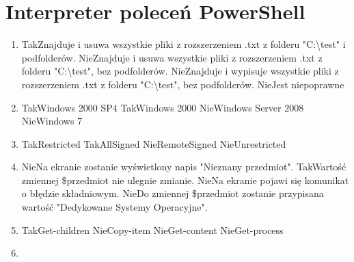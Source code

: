 

\newpage
\section{Interpreter poleceń PowerShell}
	\begin{enumerate}
		\item {}%
		{Tak}{Znajduje i usuwa wszystkie pliki z rozszerzeniem .txt z folderu "C:\textbackslash test" i podfolderów.}%
		{Nie}{Znajduje i usuwa wszystkie pliki z rozszerzeniem .txt z folderu "C:\textbackslash test", bez podfolderów.}%
		{Nie}{Znajduje i wypisuje wszystkie pliki z rozszerzeniem .txt z folderu "C:\textbackslash test", bez podfolderów.}%
		{Nie}{Jest niepoprawne}
		\item {}%
		{Tak}{Windows 2000 SP4}%
		{Tak}{Windows 2000}%
		{Nie}{Windows Server 2008}%
		{Nie}{Windows 7}
		\item {}%
		{Tak}{Restricted}%
		{Tak}{AllSigned}%
		{Nie}{RemoteSigned}%
		{Nie}{Unrestricted}
		\item {}%
		{Nie}{Na ekranie zostanie wyświetlony napis "Nieznany przedmiot".}%
		{Tak}{Wartość zmiennej \$przedmiot nie ulegnie zmianie.}%
		{Nie}{Na ekranie pojawi się komunikat o błędzie składniowym.}%
		{Nie}{Do zmiennej \$przedmiot zostanie przypisana wartość "Dedykowane Systemy Operacyjne".}
		\newpage
		\item {}%
		{Tak}{Get-children}%
		{Nie}{Copy-item}%
		{Nie}{Get-content}%
		{Nie}{Get-process}
		\item {}%

\end{enumerate}
